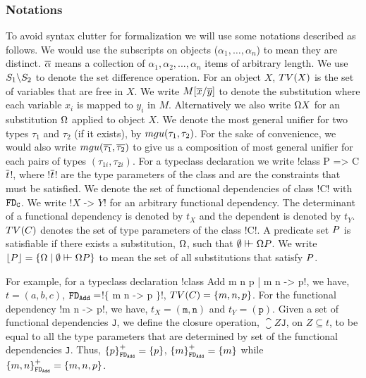 \documentclass[format=acmsmall,manuscript,review,screen,nonacm,margin=1in,11pt]{acmart}
\begin{document}
\subsubsection {Notations}\label{subsubsec:fd-notations}
To avoid syntax clutter for formalization we will use some notations described as follows.
We would use the subscripts on objects ($\alpha_1,\ldots, \alpha_n$) to mean they are distinct.
$\overline{\alpha}$ means a collection of $\alpha_1, \alpha_2, ..., \alpha_n$ items of arbitrary length.
We use $S_1 \backslash S_2$ to denote the set difference operation. For an object $X$,
$TV(X)$ is the set of variables that are free in $X$.
We write $M[\overline{x}/\overline{y}]$ to denote the substitution where each variable
$x_i$ is mapped to $y_i$ in $M$. Alternatively we also
write $\Omega X$ for an substitution $\Omega$ applied to object $X$.
We denote the most general unifier for two types $\tau_1$ and $\tau_2$ (if it exists),
by $mgu(\tau_1,\tau_2)$\cite{robinson_machine-oriented_1965}. For the sake of convenience,
we would also write $mgu(\overline{\tau_1},\overline{\tau_2})$ to give us a composition of most general
unifier for each pairs of types $(\tau_{1i}, \tau_{2i})$.
For a typeclass declaration we write !class P => C $\overline{t}$!, where !$\overline{t}$! are the type parameters
of the class and \Preds{} are the constraints that must be satisfied.
We denote the set of functional dependencies of class !C! with $\texttt{FD}_\texttt{C}$.
We write !$X$ -> $Y$! for an arbitrary functional dependency.
The determinant of a functional dependency is denoted by $t_{X}$
and the dependent is denoted by  $t_{Y}$. $TV(C)$ denotes the set of type parameters
of the class !C!. A predicate set $P$ is satisfiable if there exists a substitution,
$\Omega$, such that $\emptyset\vdash\hspace{-0.7ex}\vdash \Omega P$.
We write $\lfloor P\rfloor = \{\Omega \mid \emptyset \vdash\hspace{-0.7ex}\vdash \Omega P\}$
to mean the set of all substitutions that satisfy $P$.

For example, for a typeclass declaration !class Add m n p | m n -> p!,
we have, $t = (a, b, c)$, $\texttt{FD}_\texttt{Add}=$!$\{$ m n -> p $\}$!, $TV(C) = \{m, n, p\}$.
For the functional dependency !m n -> p!, we have, $t_X = {(\texttt{m},\texttt{n})}$ and $t_Y = {(\texttt{p})}$.
Given a set of functional dependencies $\texttt{J}$, we define the closure operation,
$\closure Z {\texttt{J}}$, on $Z \subseteq t$, to be equal to all the type parameters
that are determined by set of the functional dependencies \texttt{J}.
Thus, ${\{p\}}^{+}_{\texttt{FD}_\texttt{Add}} = \{p\}$,
${\{m\}}^{+}_{\texttt{FD}_\texttt{Add}} = \{m\}$ while ${\{m, n\}}^{+}_{\texttt{FD}_\texttt{Add}} = \{m, n, p\}$.
\end{document}
